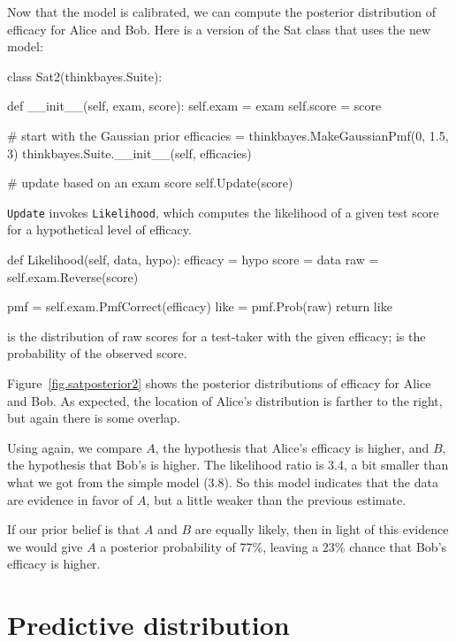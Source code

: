 \documentclass[12pt]{book}
\theoremstyle{exercise}
\begin{document}
Now that the model is calibrated, we can compute the posterior
distribution of efficacy for Alice and Bob.  Here is a version of the
Sat class that uses the new model:

\begin{code}
class Sat2(thinkbayes.Suite):

    def __init__(self, exam, score):
        self.exam = exam
        self.score = score

        # start with the Gaussian prior
        efficacies = thinkbayes.MakeGaussianPmf(0, 1.5, 3)
        thinkbayes.Suite.__init__(self, efficacies)

        # update based on an exam score
        self.Update(score)
\end{code}

\verb"Update" invokes
\verb"Likelihood", which computes the likelihood of a given test score
for a hypothetical level of efficacy.

\begin{code}
    def Likelihood(self, data, hypo):
        efficacy = hypo
        score = data
        raw = self.exam.Reverse(score)

        pmf = self.exam.PmfCorrect(efficacy)
        like = pmf.Prob(raw)
        return like
\end{code}

 is the distribution of raw scores for a test-taker
with the given efficacy;  is the probability of
the observed score.

Figure~\ref{fig.satposterior2} shows the posterior distributions
of efficacy for Alice and Bob.  As expected, the location
of Alice's distribution is farther to the right, but again there
is some overlap.

Using  again, we compare $A$, the
hypothesis that Alice's efficacy is higher, and $B$, the
hypothesis that Bob's is higher.  The likelihood ratio is
3.4, a bit smaller than what we got from the simple model (3.8).
So this model indicates that the data are evidence in favor
of $A$, but a little weaker than the previous estimate.

If our prior belief is that $A$ and $B$ are equally likely,
then in light of this evidence we would give $A$ a posterior
probability of 77\%, leaving a 23\% chance that Bob's efficacy
is higher.


\section{Predictive distribution}
\end{document}
